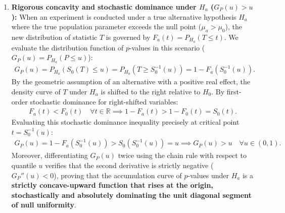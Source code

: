\begin{solucion}
\begin{enumerate}
		\item \textbf{Rigorous concavity and stochastic dominance under $H_a$ ($G_P(u) > u$):}
		When an experiment is conducted under a true alternative hypothesis $H_a$ where the true population parameter exceeds the null point ($\mu_a > \mu_0$), the new distribution of statistic $T$ is governed by $F_a(t) = P_{H_a}(T \le t)$. We evaluate the distribution function of $p$-values in this scenario ($G_P(u) = P_{H_a}(P \le u)$):
		\begin{align}
			G_P(u) = P_{H_a}\left( S_0(T) \le u \right) = P_{H_a}\left( T \ge S_0^{-1}(u) \right) = 1 - F_a\left( S_0^{-1}(u) \right).
		\end{align}
		By the geometric assumption of an alternative with a positive real effect, the density curve of $T$ under $H_a$ is shifted to the right relative to $H_0$. By first-order stochastic dominance for right-shifted variables:
		\begin{align}
			F_a(t) < F_0(t) \quad \forall t \in \mathbb{R} \implies 1 - F_a(t) > 1 - F_0(t) = S_0(t).
		\end{align}
		Evaluating this stochastic dominance inequality precisely at critical point $t = S_0^{-1}(u)$:
		\begin{align}
			G_P(u) = 1 - F_a\left( S_0^{-1}(u) \right) > S_0\left( S_0^{-1}(u) \right) = u \implies G_P(u) > u \quad \forall u \in (0,1).
		\end{align}
		Moreover, differentiating $G_P(u)$ twice using the chain rule with respect to quantile $u$ verifies that the second derivative is strictly negative ($G_P''(u) < 0$), proving that the accumulation curve of $p$-values under $H_a$ is a \textbf{strictly concave-upward function that rises at the origin, stochastically and absolutely dominating the unit diagonal segment of null uniformity}.
		

\end{enumerate}
\end{solucion}
